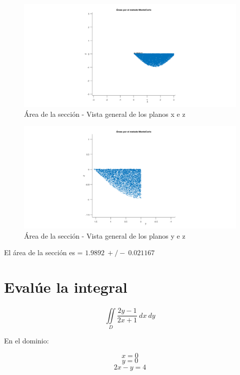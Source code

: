 \documentclass{article}
\begin{document}
\clearpage
\newpage

\begin{figure}[H]
\centering
    \includegraphics[width=1\textwidth]{images/FIG07C.png}
    \caption{Área de la sección - Vista general de los planos x e z}
\end{figure}

\begin{figure}[H]
\centering
    \includegraphics[width=1\textwidth]{images/FIG07D.png}
    \caption{Área de la sección - Vista general de los planos y e z}
\end{figure}

El área de la sección es = $1.9892~+/-~0.021167$

\section{Evalúe la integral}

\begin{equation}
\iint \limits_{D}^{~}\frac{2y-1}{2x+1}~dx~dy
\end{equation}

En el dominio:

\begin{equation}
x=0
\end{equation}
\begin{equation}
y=0
\end{equation}
\begin{equation}
2x-y=4
\end{equation}
\end{document}
